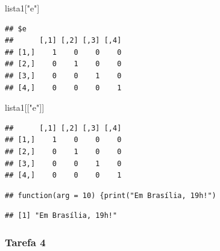\documentclass[
]{book}
\newenvironment{Shaded}{\begin{snugshade}}{\end{snugshade}}
\newcommand{\DataTypeTok}[1]{\textcolor[rgb]{0.13,0.29,0.53}{#1}}
\newcommand{\DecValTok}[1]{\textcolor[rgb]{0.00,0.00,0.81}{#1}}
\newcommand{\KeywordTok}[1]{\textcolor[rgb]{0.13,0.29,0.53}{\textbf{#1}}}
\newcommand{\NormalTok}[1]{#1}
\newcommand{\OperatorTok}[1]{\textcolor[rgb]{0.81,0.36,0.00}{\textbf{#1}}}
\newcommand{\StringTok}[1]{\textcolor[rgb]{0.31,0.60,0.02}{#1}}
\theoremstyle{definition}
\theoremstyle{definition}
\theoremstyle{definition}
\theoremstyle{remark}
\begin{document}
\begin{Shaded}
\begin{Highlighting}[]
\NormalTok{lista1[}\StringTok{"e"}\NormalTok{]}
\end{Highlighting}
\end{Shaded}

\begin{verbatim}
## $e
##      [,1] [,2] [,3] [,4]
## [1,]    1    0    0    0
## [2,]    0    1    0    0
## [3,]    0    0    1    0
## [4,]    0    0    0    1
\end{verbatim}

\begin{Shaded}
\begin{Highlighting}[]
\NormalTok{lista1[[}\StringTok{"e"}\NormalTok{]]}
\end{Highlighting}
\end{Shaded}

\begin{verbatim}
##      [,1] [,2] [,3] [,4]
## [1,]    1    0    0    0
## [2,]    0    1    0    0
## [3,]    0    0    1    0
## [4,]    0    0    0    1
\end{verbatim}

\begin{Shaded}
\end{Shaded}

\begin{verbatim}
## function(arg = 10) {print("Em Brasília, 19h!")
\end{verbatim}

\begin{Shaded}
\end{Shaded}

\begin{verbatim}
## [1] "Em Brasília, 19h!"
\end{verbatim}

\hypertarget{tarefa-4}{%
\subsubsection*{Tarefa 4}\label{tarefa-4}}
\end{document}
